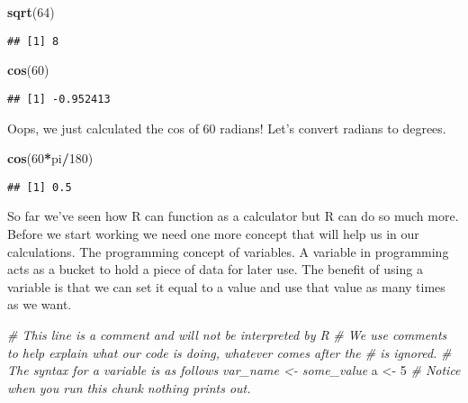 \documentclass[]{book}
\newenvironment{Shaded}{\begin{snugshade}}{\end{snugshade}}
\newcommand{\KeywordTok}[1]{\textcolor[rgb]{0.13,0.29,0.53}{\textbf{#1}}}
\newcommand{\DecValTok}[1]{\textcolor[rgb]{0.00,0.00,0.81}{#1}}
\newcommand{\StringTok}[1]{\textcolor[rgb]{0.31,0.60,0.02}{#1}}
\newcommand{\CommentTok}[1]{\textcolor[rgb]{0.56,0.35,0.01}{\textit{#1}}}
\newcommand{\OperatorTok}[1]{\textcolor[rgb]{0.81,0.36,0.00}{\textbf{#1}}}
\newcommand{\NormalTok}[1]{#1}
\begin{document}
\begin{Shaded}
\begin{Highlighting}[]
\KeywordTok{sqrt}\NormalTok{(}\DecValTok{64}\NormalTok{)}
\end{Highlighting}
\end{Shaded}

\begin{verbatim}
## [1] 8
\end{verbatim}

\begin{Shaded}
\begin{Highlighting}[]
\KeywordTok{cos}\NormalTok{(}\DecValTok{60}\NormalTok{)}
\end{Highlighting}
\end{Shaded}

\begin{verbatim}
## [1] -0.952413
\end{verbatim}

Oops, we just calculated the cos of 60 radians! Let's convert radians to
degrees.

\begin{Shaded}
\begin{Highlighting}[]
\KeywordTok{cos}\NormalTok{(}\DecValTok{60}\OperatorTok{*}\NormalTok{pi}\OperatorTok{/}\DecValTok{180}\NormalTok{)}
\end{Highlighting}
\end{Shaded}

\begin{verbatim}
## [1] 0.5
\end{verbatim}

So far we've seen how R can function as a calculator but R can do so
much more. Before we start working we need one more concept that will
help us in our calculations. The programming concept of variables. A
variable in programming acts as a bucket to hold a piece of data for
later use. The benefit of using a variable is that we can set it equal
to a value and use that value as many times as we want.

\begin{Shaded}
\begin{Highlighting}[]
\CommentTok{# This line is a comment and will not be interpreted by R}
\CommentTok{# We use comments to help explain what our code is doing, whatever comes after the # is ignored.}
\CommentTok{# The syntax for a variable is as follows var_name <- some_value}
\NormalTok{a <-}\StringTok{ }\DecValTok{5}
\CommentTok{# Notice when you run this chunk nothing prints out.}
\end{Highlighting}
\end{Shaded}
\end{document}
